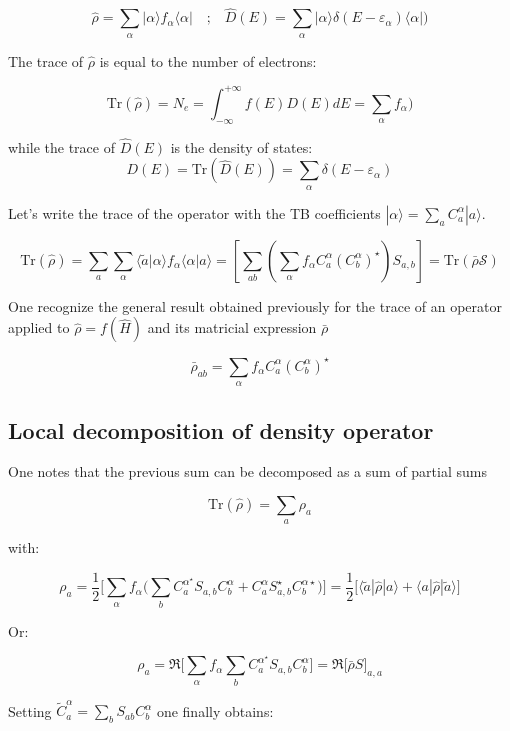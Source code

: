 \documentclass{article}
\newcommand{\bra}[1]{\langle #1|}
\newcommand{\ket}[1]{|#1\rangle}
\newcommand{\braket}[2]{\langle #1|#2\rangle}
\newcommand{\op}[1]{\hat{#1}}
\begin{document}
\[\op{\rho}=\sum_{\alpha} |\alpha \rangle f_{\alpha}\langle \alpha | \quad \mbox{;} \quad
\op{D}(E)=\sum_{\alpha} |\alpha \rangle \delta(E-\varepsilon_{\alpha})\langle \alpha | )
\]

\noindent
The trace of $\op{\rho}$ is equal to the number of electrons:

\[ \mbox{Tr}(\op{\rho})=N_e= \int_{-\infty}^{+\infty} f(E) D(E)dE = \sum_{\alpha }f_{\alpha}) \]

\noindent
while the trace of $\op{D}(E)$  is the density of states:
\[
D(E)=\text{Tr}(\op{D}(E))=\sum_{\alpha}  \delta(E-\varepsilon_{\alpha})
\]

\noindent Let's write the trace of the operator with the TB coefficients $ \ket{\alpha}=\sum_a C_a^{\alpha}\ket{a}$.
 
\[ \displaystyle \mbox{Tr}(\op{\rho})=
 \sum_{a}\sum_{\alpha} \braket{\tilde{a}}{\alpha} f_{\alpha}  \braket{\alpha}{a}
= \left[\sum_{a  b} 
\left( \sum_{\alpha}  f_{\alpha}  
C_{a}^{\alpha} (C_{b }^{\alpha})^{\star}\right)
 S_{a,b} \right]=\text{Tr} \left( \bar{\rho} \mathcal{S}\right)
 \]

\noindent
One recognize the general result obtained previously for the trace of an operator applied to $\op{\rho}=f(\op{H})$ and its matricial expression $\bar{\rho}$

\[ \bar{\rho}_{a b}=  \sum_{\alpha} f_{\alpha} C_{a}^{\alpha}(C_{b}^{\alpha})^{\star}    \]

\subsection{Local decomposition of density operator}

\noindent One notes that the previous sum can be decomposed as a sum of partial sums

\[ \displaystyle \mbox{Tr}(\op{\rho})=\sum_{a} \rho_{a} \]

\noindent
with:

\[\rho_{a }=\frac{1}{2}\Bigg[\sum_{\alpha } f_{\alpha}
\Bigg( \sum_{b} C_{a}^{\alpha^{\star}}S_{a,b}C_{b}^{\alpha}+ C_{a}^{\alpha}S_{a,b}^{\star}
C_{b}^{\alpha \star} \Bigg)\Bigg]= 
\frac{1}{2} \Big[ \bra{\tilde{a}} \op{\rho} \ket{a} + \bra{a} \op{\rho} \ket{\tilde{a}}  \Big]\]

\noindent Or:

\[\rho_{a}=\Re \Bigg[\sum_{\alpha} f_{\alpha}
\sum_{b} C_{a}^{\alpha^{\star}}S_{a,b}C_{b}^{\alpha}\Bigg]
= \Re \Bigg[\bar{\rho}S \Bigg]_{a,a}\]


\noindent
Setting $\displaystyle \widetilde{C}_{a}^{\alpha}=\sum_{b } S_{ab} C_{b}^{\alpha}$
\noindent
one finally obtains:
\end{document}
